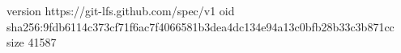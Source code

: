 version https://git-lfs.github.com/spec/v1
oid sha256:9fdb6114c373cf71f6ac7f4066581b3dea4dc134e94a13c0bfb28b33c3b871cc
size 41587
